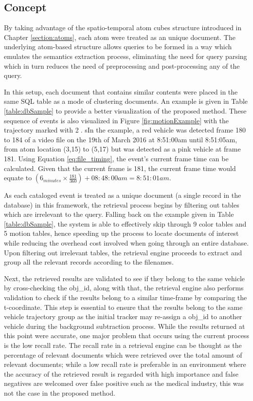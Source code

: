 \subsection{Concept}
By taking advantage of the spatio-temporal atom cubes structure introduced in Chapter \ref{section:atoms}, each atom were treated as an unique document. The underlying atom-based structure allows queries to be formed in a way which emulates the semantics extraction process, eliminating the need for query parsing which in turn reduces the need of preprocessing and post-processing any of the query. 

In this setup, each document that contains similar contents were placed in the same SQL table as a mode of clustering documents. An example is given in Table \ref{table:dbSample} to provide a better visualization of the proposed method. These sequence of events is also visualized in Figure \ref{fig:motionExample} with the trajectory marked with \textcircled{2}. sIn the example, a red vehicle was detected frame 180 to 184 of a video file on the 19th of March 2016 at 8:51:00am until 8:51:05am, from atom location (3,15) to (5,17) but was detected as a pink vehicle at frame 181. Using Equation \ref{eq:file_timing}, the event's current frame time can be calculated. Given that the current frame is 181, the current frame time would equate to  $(6_{minutes} \times \frac{181}{360}) + 08:48:00am = 8:51:01am$.

As each cataloged event is treated as a unique document (a single record in the database) in this framework, the retrieval process begins by filtering out tables which are irrelevant to the query. Falling back on the example given in Table \ref{table:dbSample}, the system is able to effectively skip through 9 color tables and 5 motion tables, hence speeding up the process to locate documents of interest while reducing the overhead cost involved when going through an entire database. Upon filtering out irrelevant tables, the retrieval engine proceeds to extract and group all the relevant records according to the filenames.

Next, the retrieved results are validated to see if they belong to the same vehicle by cross-checking the obj\_id, along with that, the retrieval engine also performs validation to check if the results belong to a similar time-frame by comparing the t-coordinate. This step is essential to ensure that the results belong to the same vehicle trajectory group as the initial tracker may re-assign a obj\_id to another vehicle during the background subtraction process. While the results returned at this point were accurate, one major problem that occurs using the current process is the low recall rate. The recall rate in a retrieval engine can be thought as the percentage of relevant documents which were retrieved over the total amount of relevant documents; while a low recall rate is preferable in an environment where the accuracy of the retrieved result is regarded with high importance and false negatives are welcomed over false positive such as the medical industry, this was not the case in the proposed method.

